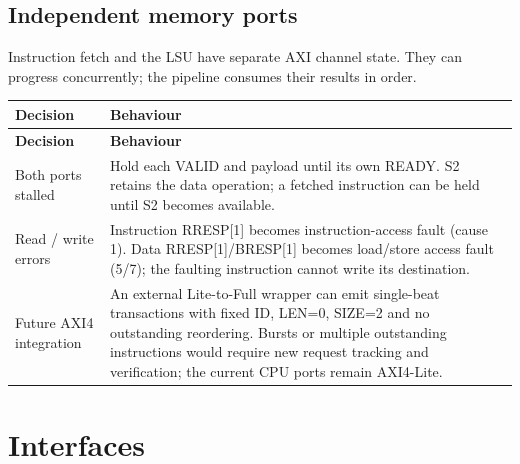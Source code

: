 \documentclass[11pt]{article}
\begin{document}
\subsection{Independent memory ports}
\noindent Instruction fetch and the LSU have separate AXI channel state. They can progress concurrently; the pipeline consumes their results in order.\par\medskip
{\small
\begin{longtable}{@{}L{0.2500\dimexpr\linewidth-12pt\relax}L{0.7500\dimexpr\linewidth-12pt\relax}@{}}
\toprule
\textbf{Decision} & \textbf{Behaviour} \\ \midrule
\endfirsthead
\toprule
\textbf{Decision} & \textbf{Behaviour} \\ \midrule
\endhead
Both ports stalled & Hold each VALID and payload until its own READY. S2 retains the data operation; a fetched instruction can be held until S2 becomes available. \\ \addlinespace[3pt]
Read / write errors & Instruction RRESP[1] becomes instruction-access fault (cause 1). Data RRESP[1]/BRESP[1] becomes load/store access fault (5/7); the faulting instruction cannot write its destination. \\ \addlinespace[3pt]
Future AXI4 integration & An external Lite-to-Full wrapper can emit single-beat transactions with fixed ID, LEN=0, SIZE=2 and no outstanding reordering. Bursts or multiple outstanding instructions would require new request tracking and verification; the current CPU ports remain AXI4-Lite. \\*
\bottomrule\end{longtable}}

\clearpage
\section{Interfaces}
\end{document}
